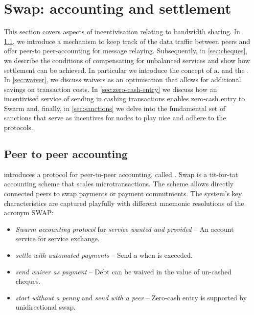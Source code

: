 \section{Swap: accounting and settlement\statusgreen}\label{sec:accounting-and-settlement}

\green{}

This section covers aspects of incentivisation relating to bandwidth sharing. 
In \ref{sec:accounting}, we introduce a mechanism to keep track of the data traffic between peers and offer peer-to peer-accounting for message relaying.
Subsequently, in \ref{sec:cheques}, we describe the conditions of compensating for unbalanced services and show how settlement can be achieved.
In particular we introduce the concept of a.  and the . In \ref{sec:waiver}, we discuss waivers as an optimisation that allows for additional savings on transaction costs. In \ref{sec:zero-cash-entry} we discuss how an incentivised service of sending in cashing transactions enables zero-cash entry to Swarm and, finally, in \ref{sec:sanctions} we delve into the fundamental set of sanctions that serve as incentives for nodes to play nice and adhere to the protocols.

\subsection{Peer to peer accounting\statusgreen}\label{sec:accounting}


\cite{ethersphere2016sw3} introduces a protocol for peer-to-peer accounting, called . Swap is a tit-for-tat accounting scheme that scales microtransactions. The scheme allows directly connected peers to swap payments or payment commitments. The system's key characteristics are captured playfully with different mnemonic resolutions of the acronym SWAP:

\begin{itemize}[noitemsep]
    \item \emph{Swarm accounting protocol} for \emph{service wanted and provided} -- An account service for service exchange.
    \item \emph{settle with automated payments} -- Send a  when  is exceeded.
    \item \emph{send waiver as payment} -- Debt can be waived in the value of un-cashed cheques. 
    \item \emph{start without a penny} and \emph{send with a peer} -- Zero-cash entry is supported by unidirectional swap.
\end{itemize}

